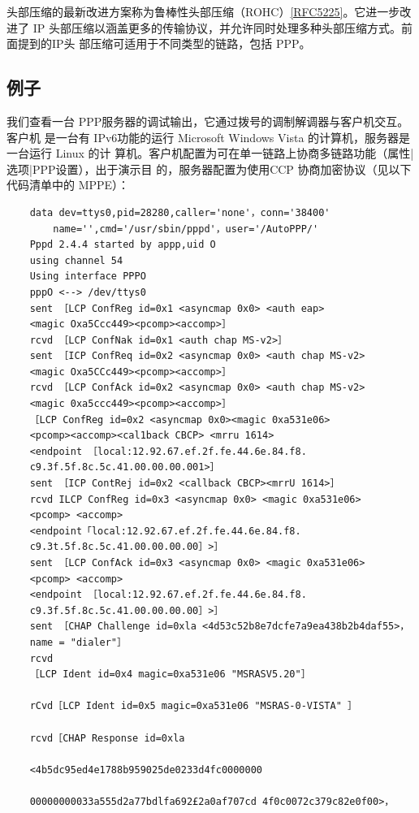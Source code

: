 头部压缩的最新改进方案称为鲁棒性头部压缩（ROHC）\href{https://www.rfc-editor.org/rfc/rfc5225}{[RFC5225]}。它进一步改进了
IP 头部压缩以涵盖更多的传输协议，并允许同时处理多种头部压缩方式。前面提到的IP头
部压缩可适用于不同类型的链路，包括 PPP。

\subsection{例子}

我们查看一台 PPP服务器的调试输出，它通过拨号的调制解调器与客户机交互。客户机
是一台有 IPv6功能的运行 Microsoft Windows Vista 的计算机，服务器是一台运行 Linux 的计
算机。客户机配置为可在单一链路上协商多链路功能（属性|选项|PPP设置），出于演示目
的，服务器配置为使用CCP 协商加密协议（见以下代码清单中的 MPPE）：

\begin{verbatim}
    data dev=ttys0,pid=28280,caller='none'，conn='38400'
        name='',cmd='/usr/sbin/pppd'，user='/AutoPPP/'
    Pppd 2.4.4 started by appp,uid O
    using channel 54
    Using interface PPPO
    pppO <--> /dev/ttys0
    sent ［LCP ConfReg id=0x1 <asyncmap 0x0> <auth eap>
    <magic Oxa5Ccc449><pcomp><accomp>］
    rcvd ［LCP ConfNak id=0x1 <auth chap MS-v2>］
    sent ［ICP ConfReq id=0x2 <asyncmap 0x0> <auth chap MS-v2>
    <magic Oxa5CCc449><pcomp><accomp>］
    rcvd ［LCP ConfAck id=0x2 <asyncmap 0x0> <auth chap MS-v2>
    <magic 0xa5ccc449><pcomp><accomp>］
    ［LCP ConfReg id=0x2 <asyncmap 0x0><magic 0xa531e06>
    <pcomp><accomp><cal1back CBCP> <mrru 1614>
    <endpoint ［local:12.92.67.ef.2f.fe.44.6e.84.f8.
    c9.3f.5f.8c.5c.41.00.00.00.001>］
    sent ［ICP ContRej id=0x2 <callback CBCP><mrrU 1614>］
    rcvd ILCP ConfReg id=0x3 <asyncmap 0x0> <magic 0xa531e06>
    <pcomp> <accomp>
    <endpoint「local:12.92.67.ef.2f.fe.44.6e.84.f8.
    c9.3t.5f.8c.5c.41.00.00.00.00］>］
    sent ［LCP ConfAck id=0x3 <asyncmap 0x0> <magic 0xa531e06>
    <pcomp> <accomp>
    <endpoint ［local:12.92.67.ef.2f.fe.44.6e.84.f8.
    c9.3f.5f.8c.5c.41.00.00.00.00］>］
    sent ［CHAP Challenge id=0xla <4d53c52b8e7dcfe7a9ea438b2b4daf55>，
    name = "dialer"］
    rcvd
    ［LCP Ident id=0x4 magic=0xa531e06 "MSRASV5.20"］
    
    rCvd［LCP Ident id=0x5 magic=0xa531e06 "MSRAS-0-VISTA" ］
    
    rcvd［CHAP Response id=0xla
    
    <4b5dc95ed4e1788b959025de0233d4fc0000000
    
    00000000033a555d2a77bdlfa692£2a0af707cd 4f0c0072c379c82e0f00>，
    

\end{verbatim}
